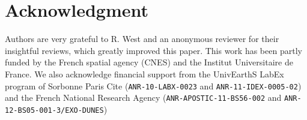 \documentclass[preprint,twocolumn,5p,authoryear,compress,colorlinks=true]{elsarticle}
\begin{document}
\section*{Acknowledgment}
Authors are very grateful to R. West and an anonymous reviewer for their insightful reviews, which greatly improved this paper. This work has been partly funded by the French spatial agency (CNES) and the Institut Universitaire de France. We also acknowledge financial support from the UnivEarthS LabEx program of Sorbonne Paris Cite (\texttt{ANR-10-LABX-0023} and \texttt{ANR-11-IDEX-0005-02}) and the French National Research Agency (\texttt{ANR-APOSTIC-11-BS56-002} and \texttt{ANR-12-BS05-001-3/EXO-DUNES})

\vfill\null
\clearpage

\end{document}
